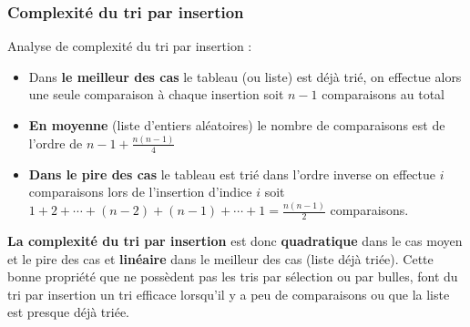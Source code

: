 \documentclass[11pt]{article}
\providecommand{\tightlist}{%
      \setlength{\itemsep}{0pt}\setlength{\parskip}{0pt}}
\begin{document}
    \subsubsection{Complexité du tri par
insertion}\label{complexituxe9-du-tri-par-insertion}

    Analyse de complexité du tri par insertion :

\begin{itemize}
\tightlist
\item
  Dans \textbf{le meilleur des cas} le tableau (ou liste) est déjà trié,
  on effectue alors une seule comparaison à chaque insertion soit
  \(n-1\) comparaisons au total
\item
  \textbf{En moyenne} (liste d'entiers aléatoires) le nombre de
  comparaisons est de l'ordre de \(n-1+\frac{n(n-1)}{4}\)
\item
  \textbf{Dans le pire des cas} le tableau est trié dans l'ordre inverse
  on effectue \(i\) comparaisons lors de l'insertion d'indice \(i\) soit
  \(1+2+\cdots+(n-2)+(n-1)+\cdots+1=\frac{n(n-1)}{2}\) comparaisons.
\end{itemize}

\textbf{La complexité du tri par insertion } est donc
\textbf{quadratique} dans le cas moyen et le pire des cas et
\textbf{linéaire} dans le meilleur des cas (liste déjà triée). Cette
bonne propriété que ne possèdent pas les tris par sélection ou par
bulles, font du tri par insertion un tri efficace lorsqu'il y a peu de
comparaisons ou que la liste est presque déjà triée.
\end{document}

